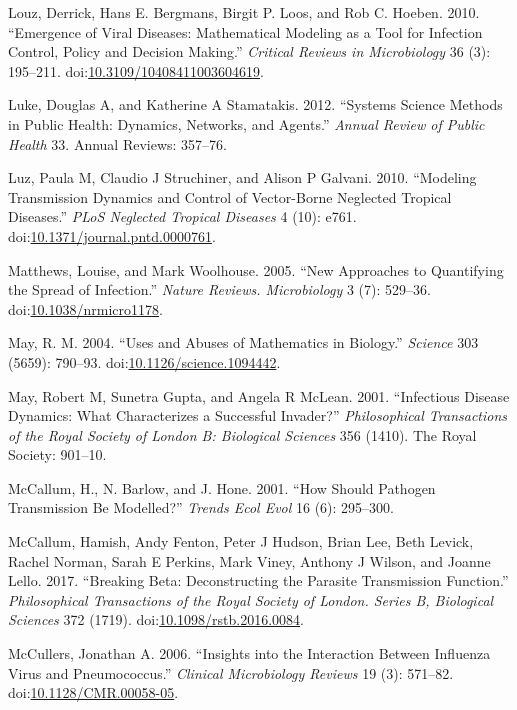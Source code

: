 \documentclass[]{article}
\theoremstyle{definition}
\theoremstyle{definition}
\theoremstyle{definition}
\theoremstyle{remark}
\begin{document}
\hypertarget{ref-louz10}{}
Louz, Derrick, Hans E. Bergmans, Birgit P. Loos, and Rob C. Hoeben.
2010. ``Emergence of Viral Diseases: Mathematical Modeling as a Tool for
Infection Control, Policy and Decision Making.'' \emph{Critical Reviews
in Microbiology} 36 (3): 195--211.
doi:\href{https://doi.org/10.3109/10408411003604619}{10.3109/10408411003604619}.

\hypertarget{ref-luke12}{}
Luke, Douglas A, and Katherine A Stamatakis. 2012. ``Systems Science
Methods in Public Health: Dynamics, Networks, and Agents.'' \emph{Annual
Review of Public Health} 33. Annual Reviews: 357--76.

\hypertarget{ref-luz10}{}
Luz, Paula M, Claudio J Struchiner, and Alison P Galvani. 2010.
``Modeling Transmission Dynamics and Control of Vector-Borne Neglected
Tropical Diseases.'' \emph{PLoS Neglected Tropical Diseases} 4 (10):
e761.
doi:\href{https://doi.org/10.1371/journal.pntd.0000761}{10.1371/journal.pntd.0000761}.

\hypertarget{ref-matthews05}{}
Matthews, Louise, and Mark Woolhouse. 2005. ``New Approaches to
Quantifying the Spread of Infection.'' \emph{Nature Reviews.
Microbiology} 3 (7): 529--36.
doi:\href{https://doi.org/10.1038/nrmicro1178}{10.1038/nrmicro1178}.

\hypertarget{ref-may04}{}
May, R. M. 2004. ``Uses and Abuses of Mathematics in Biology.''
\emph{Science} 303 (5659): 790--93.
doi:\href{https://doi.org/10.1126/science.1094442}{10.1126/science.1094442}.

\hypertarget{ref-may01}{}
May, Robert M, Sunetra Gupta, and Angela R McLean. 2001. ``Infectious
Disease Dynamics: What Characterizes a Successful Invader?''
\emph{Philosophical Transactions of the Royal Society of London B:
Biological Sciences} 356 (1410). The Royal Society: 901--10.

\hypertarget{ref-mccallum01}{}
McCallum, H., N. Barlow, and J. Hone. 2001. ``How Should Pathogen
Transmission Be Modelled?'' \emph{Trends Ecol Evol} 16 (6): 295--300.

\hypertarget{ref-mccallum17}{}
McCallum, Hamish, Andy Fenton, Peter J Hudson, Brian Lee, Beth Levick,
Rachel Norman, Sarah E Perkins, Mark Viney, Anthony J Wilson, and Joanne
Lello. 2017. ``Breaking Beta: Deconstructing the Parasite Transmission
Function.'' \emph{Philosophical Transactions of the Royal Society of
London. Series B, Biological Sciences} 372 (1719).
doi:\href{https://doi.org/10.1098/rstb.2016.0084}{10.1098/rstb.2016.0084}.

\hypertarget{ref-mccullers06}{}
McCullers, Jonathan A. 2006. ``Insights into the Interaction Between
Influenza Virus and Pneumococcus.'' \emph{Clinical Microbiology Reviews}
19 (3): 571--82.
doi:\href{https://doi.org/10.1128/CMR.00058-05}{10.1128/CMR.00058-05}.
\end{document}
